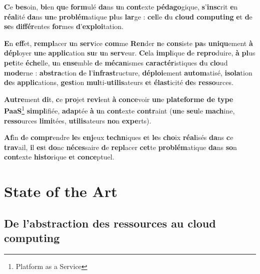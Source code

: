 \documentclass{rapportClass} %
\begin{document}
\textbf{C}e \textbf{bes}oin, \textbf{bi}en \textbf{qu}e \textbf{form}ulé \textbf{da}ns \textbf{u}n \textbf{cont}exte \textbf{pédago}gique, \textbf{s}’\textbf{insc}rit \textbf{e}n
\textbf{réal}ité \textbf{da}ns \textbf{un}e \textbf{problém}atique \textbf{pl}us \textbf{lar}ge : \textbf{cel}le \textbf{d}u \textbf{\textbf{clo}ud
\textbf{compu}ting} \textbf{e}t \textbf{d}e \textbf{se}s \textbf{différ}entes \textbf{for}mes \textbf{d}’\textbf{exploi}tation.

\textbf{E}n \textbf{eff}et, \textbf{rempl}acer \textbf{u}n \textbf{serv}ice \textbf{com}me \textbf{Ren}der \textbf{n}e \textbf{cons}iste \textbf{pa}s \textbf{uniqu}ement
\textbf{à} \textbf{dépl}oyer \textbf{un}e \textbf{applic}ation \textbf{su}r \textbf{u}n \textbf{serv}eur. \textbf{Ce}la \textbf{impl}ique \textbf{d}e \textbf{repro}duire,
\textbf{à} \textbf{pl}us \textbf{pet}ite \textbf{éche}lle, \textbf{u}n \textbf{ense}mble \textbf{d}e \textbf{mécan}ismes \textbf{caractér}istiques \textbf{d}u
\textbf{clo}ud \textbf{mode}rne : \textbf{abstra}ction \textbf{d}e \textbf{l}’\textbf{infrast}ructure, \textbf{déploi}ement
\textbf{autom}atisé, \textbf{isola}tion \textbf{de}s \textbf{applic}ations, \textbf{gest}ion \textbf{mul}ti-\textbf{utilis}ateurs \textbf{e}t
\textbf{élast}icité \textbf{de}s \textbf{resso}urces.

\textbf{Autre}ment \textbf{di}t, \textbf{c}e \textbf{pro}jet \textbf{revi}ent \textbf{à} \textbf{conce}voir \textbf{un}e \textbf{\textbf{plate}forme \textbf{d}e
\textbf{ty}pe \textbf{Pa}aS}\footnote{Platform as a Service} \textbf{simpl}ifiée, \textbf{adap}tée \textbf{à} \textbf{u}n \textbf{cont}exte
\textbf{contr}aint (\textbf{un}e \textbf{seu}le \textbf{mach}ine, \textbf{resso}urces \textbf{limi}tées, \textbf{utilis}ateurs \textbf{no}n
\textbf{expe}rts).

\textbf{Af}in \textbf{d}e \textbf{compr}endre \textbf{le}s \textbf{enj}eux \textbf{techn}iques \textbf{e}t \textbf{le}s \textbf{cho}ix \textbf{réal}isés \textbf{da}ns \textbf{c}e
\textbf{trav}ail, \textbf{i}l \textbf{es}t \textbf{do}nc \textbf{néces}saire \textbf{d}e \textbf{repl}acer \textbf{cet}te \textbf{problém}atique \textbf{da}ns
\textbf{so}n \textbf{cont}exte \textbf{histo}rique \textbf{e}t \textbf{conce}ptuel.

\section{State of the Art}

\subsection{De l’abstraction des ressources au cloud computing}
\end{document}
